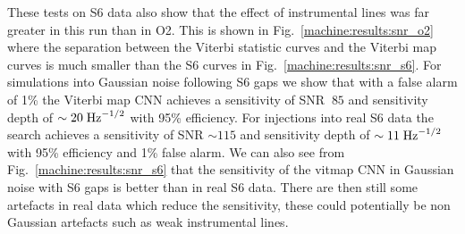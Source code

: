 These tests on S6 data also show
that the effect of instrumental lines was far greater in this run than in O2.
This is shown in Fig.~\ref{machine:results:snr_o2} where the separation between the Viterbi
statistic curves and the Viterbi map curves is much smaller than the S6 curves
in Fig.~\ref{machine:results:snr_s6}. For simulations into Gaussian noise following S6
gaps we show that with a false alarm of 1\% the Viterbi map \gls{CNN} achieves a
sensitivity of SNR $~85$ and sensitivity depth of $\sim 20\; {\rm Hz}^{-1/2}$ with
95\% efficiency. For injections into real S6 data the search achieves a
sensitivity of SNR $\sim 115$ and sensitivity depth of $ \sim11\; {\rm Hz}^{-1/2}$ with
95\% efficiency and 1\% false alarm. We can also see from
Fig.~\ref{machine:results:snr_s6} that the sensitivity of the vitmap \gls{CNN} in Gaussian noise with S6 gaps
is better than in real S6 data.
There are then still some artefacts in real data which reduce the sensitivity, these could potentially be non Gaussian artefacts such as weak instrumental lines.  

